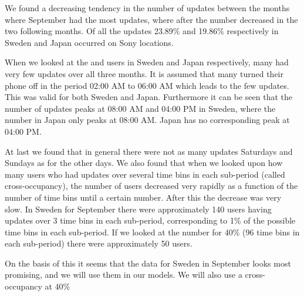 We found a decreasing tendency in the number of updates between the months where September had the most updates, where after the number decreased in the two following months. Of all the updates 23.89\% and 19.86\% respectively in Sweden and Japan occurred on Sony locations.  

When we looked at the \numberUsersSweden{} and \numberUsersJapan{} users in Sweden and Japan respectively, many had very few updates over all three months. It is assumed that many turned their phone off in the period 02:00 AM to 06:00 AM which leads to the few updates. This was valid for both Sweden and Japan. Furthermore it can be seen that the number of updates peaks at 08:00 AM and 04:00 PM in Sweden, where the number in Japan only peaks at 08:00 AM.  Japan has no corresponding peak at 04:00 PM. 

At last we found that in general there were not as many updates Saturdays and Sundays as for the other days. We also found that when we looked upon how many users who had updates over several time bins in each sub-period (called cross-occupancy), the number of users decreased very rapidly as a function of the number of time bins until a certain number. After this the decrease was very slow. In Sweden for September there were approximately 140 users having updates over 3 time bins in each sub-period, corresponding to 1\% of the possible time bins in each sub-period. If we looked at the number for 40\% (96 time bins in each sub-period) there were approximately 50 users.

On the basis of this it seems that the data for Sweden in September looks most promising, and we will use them in our models. We will also use a cross-occupancy at 40\%